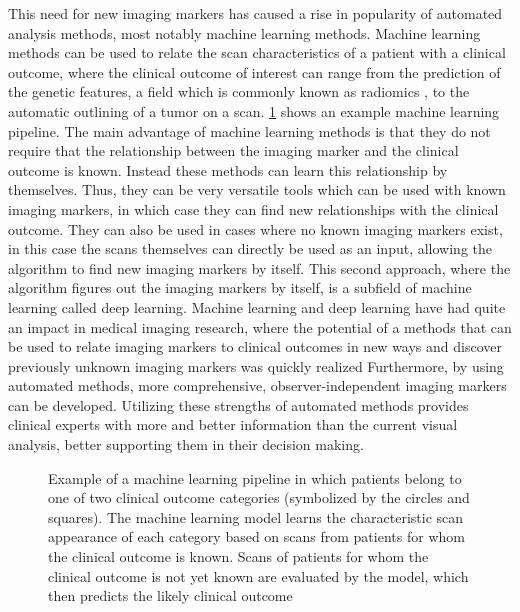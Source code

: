 This need for new imaging markers has caused a rise in popularity of automated analysis methods, most notably machine learning methods.
Machine learning methods can be used to relate the scan characteristics of a patient with a clinical outcome, where the clinical outcome of interest can range from the prediction of the genetic features, a field which is commonly known as radiomics \autocite{lambin2012radiomics}, to the automatic outlining of a \gls{tumor} on a scan.
\cref{fig:intro_example_ml} shows an example machine learning pipeline.
The main advantage of machine learning methods is that they do not require that the relationship between the imaging marker and the clinical outcome is known.
Instead these methods can learn this relationship by themselves.
Thus, they can be very versatile tools which can be used with known imaging markers, in which case they can find new relationships with the clinical outcome.
They can also be used in cases where no known imaging markers exist, in this case the scans themselves can directly be used as an input, allowing the algorithm to find new imaging markers by itself.
This second approach, where the algorithm figures out the imaging markers by itself, is a subfield of machine learning called deep learning.
Machine learning and deep learning have had quite an impact in medical imaging research, where the potential of a methods that can be used to relate imaging markers to clinical outcomes in new ways and discover previously unknown imaging markers was quickly realized \autocite{june2017deep, gillies2016radiomics}
Furthermore, by using automated methods, more comprehensive, observer-independent imaging markers can be developed.
Utilizing these strengths of automated methods provides clinical experts with more and better information than the current visual analysis, better supporting them in their decision making.


\begin{figure}[htbp]
    \centering
    \caption{Example of a machine learning pipeline in which patients belong to one of two clinical outcome categories (symbolized by the circles and squares).
    The machine learning model learns the characteristic scan appearance of each category based on scans from patients for whom the clinical outcome is known.
    Scans of patients for whom the clinical outcome is not yet known are evaluated by the model, which then predicts the likely clinical outcome}\label{fig:intro_example_ml}
\end{figure}


